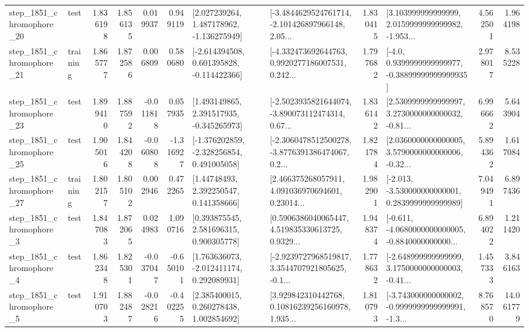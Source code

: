 \begin{tabular}{llrrrrllrlrr}
 step\_1851\_chromophore\_20 &      test &      1.836198 &    1.856135 &      0.019937 &  0.949119 &    [2.027239264, 1.487178962, -1.136275949] &  [-3.4844629524761714, -2.101426897966148, 2.05... &       1.830415 &  [3.103999999999999, 2.0159999999999982, -1.953... &            4.562501 &          1.964198 \\
 step\_1851\_chromophore\_21 &  training &      1.865777 &    1.872586 &      0.006809 &  0.580680 &   [-2.614394508, 0.601395828, -0.114422366] &  [-4.332473692644763, 0.9920277186007531, 0.242... &       1.797682 &   [-4.0, 0.9399999999999977, -0.38899999999999935] &            2.978017 &          8.535228 \\
 step\_1851\_chromophore\_23 &      test &      1.899410 &    1.887592 &     -0.011818 &  0.057935 &    [1.493149865, 2.391517935, -0.345265973] &  [-2.5023935821644074, -3.890073112474314, 0.67... &       1.836142 &  [2.5309999999999997, 3.2730000000000032, -0.81... &            6.996662 &          5.643904 \\
 step\_1851\_chromophore\_25 &      test &      1.905016 &    1.844208 &     -0.060808 & -1.316927 &   [-1.376202859, -2.328256854, 0.491005058] &  [-2.3060478512500278, -3.8776391386474067, 0.2... &       1.821784 &  [2.0360000000000005, 3.5790000000000006, -0.32... &            5.894362 &          1.617084 \\
 step\_1851\_chromophore\_27 &  training &      1.802157 &    1.805102 &      0.002946 &  0.472265 &      [1.44748493, 2.392250547, 0.141358666] &  [2.466375268057911, 4.091036970694601, 0.23014... &       1.982901 &   [-2.013, -3.530000000000001, 0.2839999999999989] &            7.049491 &          6.897436 \\
  step\_1851\_chromophore\_3 &      test &      1.847083 &    1.872065 &      0.024983 &  1.090716 &     [0.393875545, 2.581696315, 0.900305778] &  [0.5906386040065447, 4.519835330613725, 0.9329... &       1.948374 &  [-0.611, -4.0680000000000005, -0.8840000000000... &            6.894022 &          1.211420 \\
  step\_1851\_chromophore\_4 &      test &      1.862348 &    1.825301 &     -0.037047 & -0.650101 &    [1.763636073, -2.012411174, 0.292089931] &  [-2.9239727968519817, 3.3544707921805625, -0.1... &       1.778632 &  [-2.648999999999999, 3.1750000000000003, -0.41... &            1.457333 &          3.846163 \\
  step\_1851\_chromophore\_5 &      test &      1.910703 &    1.882487 &     -0.028216 & -0.402255 &     [2.385400015, 0.260278438, 1.002854692] &  [3.929842310442768, 0.10816239256160978, 1.935... &       1.810793 &  [-3.743000000000002, -0.9999999999999991, -1.3... &            8.768570 &         14.061779 \\

\end{tabular}
